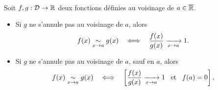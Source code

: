 \documentclass{magnolia}
\begin{document}
\begin{proposition}[utile=-3]
Soit $f,g:\mathcal{D}\to\mathbb{R}$ deux fonctions définies au voisinage de $a\in\overline{\mathbb{R}}$.
\begin{itemize}
\item Si $g$ ne s'annule pas au voisinage de $a$, alors
  \[f(x)\underset{x\rightarrow a}{\sim} g(x) \quad\Longleftrightarrow\quad
    \frac{f(x)}{g(x)}\xrightarrow[x\rightarrow a]{} 1.\]
\item Si $g$ ne s'annule pas au voisinage de $a$, sauf en $a$, alors
  \[f(x)\underset{x\rightarrow a}{\sim} g(x) \quad\Longleftrightarrow\quad
    \left[\frac{f(x)}{g(x)}\xrightarrow[x\rightarrow a]{} 1 \quad\!\text{et}\quad\! f(a)=0\right].\]
\end{itemize}
\end{proposition}

\end{document}
